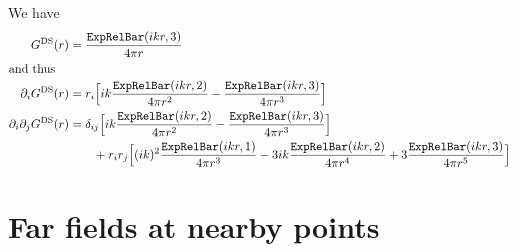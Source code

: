 \documentclass[letterpaper]{article}
\begin{document}
We have
\begin{align*}
 G^{\text{\scriptsize DS}}(r) &= \frac{\texttt{ExpRelBar}(ikr,3)}{4\pi r}
\\
\intertext{and thus}
\partial_i 
 G^{\text{\scriptsize DS}}(r) &= 
       r_i  \Big[ ik\frac{\texttt{ExpRelBar}(ikr,2)}{4\pi r^2}
                   -\frac{\texttt{ExpRelBar}(ikr,3)}{4\pi r^3}
            \Big]
\\
\partial_i \partial_j
 G^{\text{\scriptsize DS}}(r) &= 
  \delta_{ij} \Big[ ik \frac{\texttt{ExpRelBar}(ikr,2)}{4\pi r^2}
                   -\frac{\texttt{ExpRelBar}(ikr,3)}{4\pi r^3}
              \Big]
\\
&\qquad 
 +r_i r_j   \Big[ (ik)^2 \frac{\texttt{ExpRelBar}(ikr,1)}{4\pi r^3}
                  -3ik\frac{\texttt{ExpRelBar}(ikr,2)}{4\pi r^4}
                  +3\frac{\texttt{ExpRelBar}(ikr,3)}{4\pi r^5}
            \Big]
\end{align*}

\newpage
\section{Far fields at nearby points}
\end{document}

